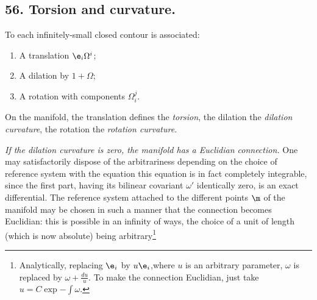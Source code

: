\subsection*{56. Torsion and curvature.}

To each infinitely-small closed contour is associated:

\begin{enumerate}
	\item A translation $\e_i\Omega^i$;
	\item A dilation by $1 + \Omega$;
	\item A rotation with components $\Omega_i^j$.
\end{enumerate}

On the manifold, the translation defines the \textit{torsion}, the dilation the \textit{dilation curvature}, the rotation the \textit{rotation curvature}.

\textit{If the dilation curvature is zero, the manifold has a Euclidian connection.} One may satisfactorily dispose of the arbitrariness depending on the choice of reference system with the equation
this equation is in fact completely integrable, since the first part, having its bilinear covariant $\omega'$ identically zero, is an exact differential. The reference system attached to the different points $\m$ of the manifold may be chosen in such a manner that the connection becomes Euclidian: this is possible in an infinity of ways, the choice of a unit of length (which is now absolute) being arbitrary\footnote{Analytically, replacing $\e_i$ by $u\e_i$,where $u$ is an arbitrary parameter, $\omega$ is replaced by $\omega + \frac{du}{u}$. To make the connection Euclidian, just take $u=C\exp{-\int\omega}$.}